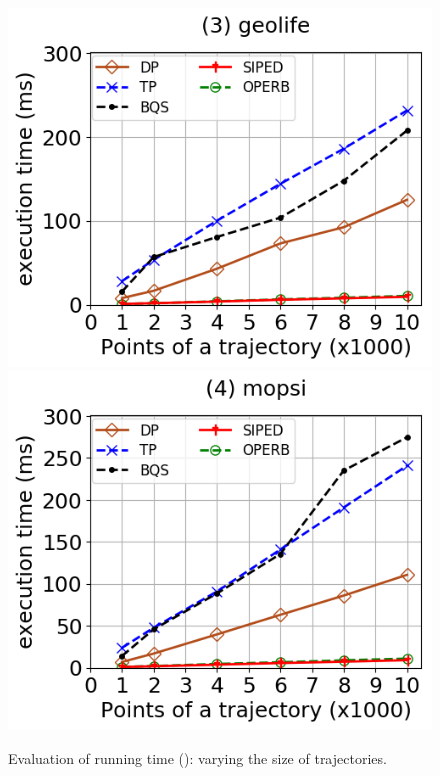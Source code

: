 \begin{figure}[tb!]
	\includegraphics[scale=0.315]{Figures/Exp-PED-time-size-geolife.png}	\hspace{1ex}
	\includegraphics[scale=0.315]{Figures/Exp-PED-time-size-mopsi.png}	\hspace{1ex}
	\vspace{-3ex}
	\caption{\small Evaluation of running time (\ped): varying the size of trajectories.}\label{fig:time-size-ped}
	\vspace{-2ex}
\end{figure}

